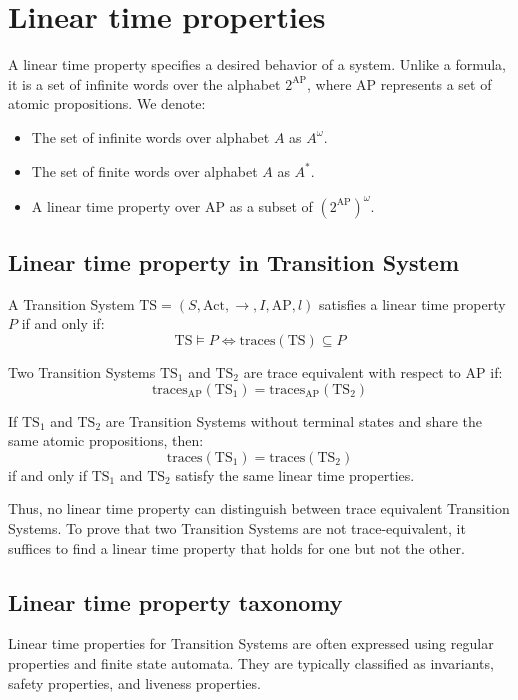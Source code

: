 \section{Linear time properties}

A linear time property specifies a desired behavior of a system. 
Unlike a formula, it is a set of infinite words over the alphabet $2^{\text{AP}}$, where $\text{AP}$ represents a set of atomic propositions.
We denote: 
\begin{itemize}
    \item The set of infinite words over alphabet $A$ as $A^\omega$. 
    \item The set of finite words over alphabet $A$ as $A^\ast$. 
    \item A linear time property over $\text{AP}$ as a subset of $\left(2^{\text{AP}}\right)^\omega$. 
\end{itemize}

\subsection{Linear time property in Transition System}
\begin{definition}
    A Transition System $\text{TS}=(S,\text{Act},\rightarrow,I,\text{AP},l)$ satisfies a linear time property $P$ if and only if: 
    \[\text{TS}\models P\Leftrightarrow\text{traces}(\text{TS})\subseteq P\] 
\end{definition}
\begin{definition}
    Two Transition Systems $\text{TS}_1$ and $\text{TS}_2$ are trace equivalent with respect to $\text{AP}$ if: 
    \[\text{traces}_{\text{AP}}(\text{TS}_1)=\text{traces}_{\text{AP}}(\text{TS}_2)\]
\end{definition}
\begin{corollary}
    If $\text{TS}_1$ and $\text{TS}_2$ are Transition Systems without terminal states and share the same atomic propositions, then:
    \[\text{traces}(\text{TS}_1)=\text{traces}(\text{TS}_2)\] 
    if and only if $\text{TS}_1$ and $\text{TS}_2$ satisfy the same linear time properties. 
\end{corollary}
\noindent Thus, no linear time property can distinguish between trace equivalent Transition Systems. 
To prove that two Transition Systems are not trace-equivalent, it suffices to find a linear time property that holds for one but not the other.

\subsection{Linear time property taxonomy}
Linear time properties for Transition Systems are often expressed using regular properties and finite state automata. 
They are typically classified as invariants, safety properties, and liveness properties.

